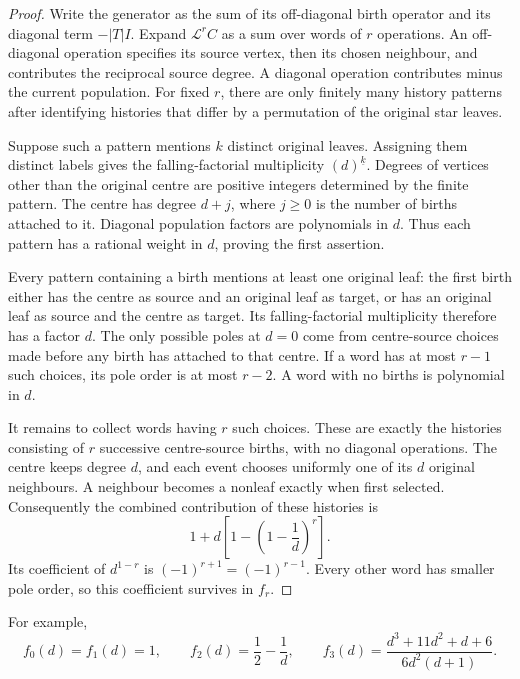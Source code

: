\begin{proof}
Write the generator as the sum of its off-diagonal birth operator and
its diagonal term $-|T|I$. Expand $\mathcal L^r C$ as a sum over words
of $r$ operations. An off-diagonal operation specifies its source vertex,
then its chosen neighbour, and contributes the reciprocal source degree.
A diagonal operation contributes minus the current population. For fixed
$r$, there are only finitely many history patterns after identifying
histories that differ by a permutation of the original star leaves.

Suppose such a pattern mentions $k$ distinct original leaves. Assigning
them distinct labels gives the falling-factorial multiplicity
$(d)^{\underline{k}}$. Degrees of vertices other than the original centre
are positive integers determined by the finite pattern. The centre has
degree $d+j$, where $j\ge0$ is the number of births attached to it.
Diagonal population factors are polynomials in $d$. Thus each pattern
has a rational weight in $d$, proving the first assertion.

Every pattern containing a birth mentions at least one original leaf:
the first birth either has the centre as source and an original leaf as
target, or has an original leaf as source and the centre as target.
Its falling-factorial multiplicity therefore has a factor $d$. The only
possible poles at $d=0$ come from centre-source choices made before any
birth has attached to that centre. If a word has at most $r-1$ such
choices, its pole order is at most $r-2$. A word with no births is
polynomial in $d$.

It remains to collect words having $r$ such choices. These are exactly
the histories consisting of $r$ successive centre-source births, with
no diagonal operations. The centre keeps degree $d$, and each event
chooses uniformly one of its $d$ original neighbours. A neighbour
becomes a nonleaf exactly when first selected. Consequently the combined
contribution of these histories is
\[
 1+d\left[1-\left(1-\frac1d\right)^r\right].
\]
Its coefficient of $d^{1-r}$ is $(-1)^{r+1}=(-1)^{r-1}$.
Every other word has smaller pole order, so this coefficient survives
in $f_r$.
\end{proof}

For example,
\[
 f_0(d)=f_1(d)=1,\qquad
 f_2(d)=\frac12-\frac1d,\qquad
 f_3(d)=\frac{d^3+11d^2+d+6}{6d^2(d+1)}.
\]

